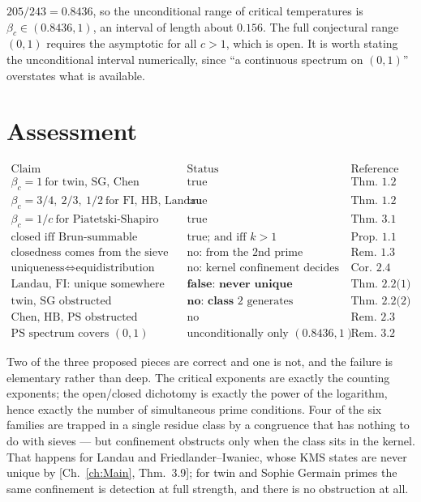 \begin{remark}\label{XXIV:rem:narrow}
$205/243=0.8436$, so the unconditional range of critical temperatures is
$\beta_c\in(0.8436,1)$, an interval of length about $0.156$. The full conjectural range
$(0,1)$ requires the asymptotic for all $c>1$, which is open. It is worth stating the
unconditional interval numerically, since ``a continuous spectrum on $(0,1)$'' overstates
what is available.
\end{remark}

\section{Assessment}

\[
\begin{array}{lll}
\text{Claim} & \text{Status} & \text{Reference}\\\hline
\beta_c=1\ \text{for twin, SG, Chen} & \text{true} & \text{Thm.~1.2}\\
\beta_c=3/4,\ 2/3,\ 1/2\ \text{for FI, HB, Landau} & \text{true} & \text{Thm.~1.2}\\
\beta_c=1/c\ \text{for Piatetski-Shapiro} & \text{true} & \text{Thm.~3.1}\\
\text{closed iff Brun-summable} & \text{true; and iff }k>1 & \text{Prop.~1.1}\\
\text{closedness comes from the sieve} & \text{no: from the 2nd prime condition} & \text{Rem.~1.3}\\
\text{uniqueness}\iff\text{equidistribution} & \text{no: kernel confinement decides} & \text{Cor.~2.4}\\
\text{Landau, FI: unique somewhere} & \textbf{false: never unique} & \text{Thm.~2.2(1)}\\
\text{twin, SG obstructed} & \textbf{no: class }2\text{ generates} & \text{Thm.~2.2(2)}\\
\text{Chen, HB, PS obstructed} & \text{no} & \text{Rem.~2.3}\\
\text{PS spectrum covers }(0,1) & \text{unconditionally only }(0.8436,1) & \text{Rem.~3.2}
\end{array}
\]

Two of the three proposed pieces are correct and one is not, and the failure is elementary
rather than deep. The critical exponents are exactly the counting exponents; the open/closed
dichotomy is exactly the power of the logarithm, hence exactly the number of simultaneous
prime conditions. Four of the six families are trapped in a single residue class by a
congruence that has nothing to do with sieves --- but confinement obstructs only when the
class sits in the kernel. That happens for Landau and Friedlander--Iwaniec, whose
$\mathrm{KMS}$ states are never unique by [Ch.~\ref{ch:Main}, Thm.~3.9]; for twin and Sophie
Germain primes the same confinement is detection at full strength, and there is no
obstruction at all.

